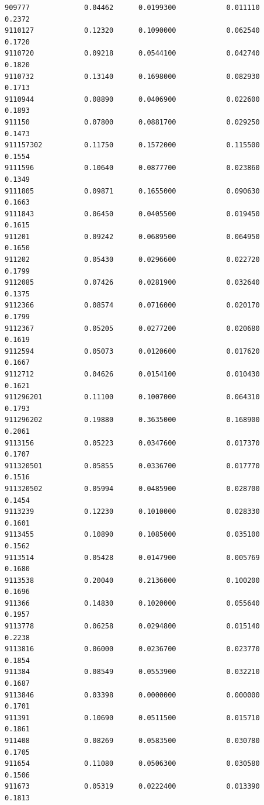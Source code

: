 \documentclass[
  letterpaper,
  DIV=11,
  numbers=noendperiod]{scrartcl}
\begin{document}
\begin{verbatim}
909777             0.04462      0.0199300            0.011110        0.2372
9110127            0.12320      0.1090000            0.062540        0.1720
9110720            0.09218      0.0544100            0.042740        0.1820
9110732            0.13140      0.1698000            0.082930        0.1713
9110944            0.08890      0.0406900            0.022600        0.1893
911150             0.07800      0.0881700            0.029250        0.1473
911157302          0.11750      0.1572000            0.115500        0.1554
9111596            0.10640      0.0877700            0.023860        0.1349
9111805            0.09871      0.1655000            0.090630        0.1663
9111843            0.06450      0.0405500            0.019450        0.1615
911201             0.09242      0.0689500            0.064950        0.1650
911202             0.05430      0.0296600            0.022720        0.1799
9112085            0.07426      0.0281900            0.032640        0.1375
9112366            0.08574      0.0716000            0.020170        0.1799
9112367            0.05205      0.0277200            0.020680        0.1619
9112594            0.05073      0.0120600            0.017620        0.1667
9112712            0.04626      0.0154100            0.010430        0.1621
911296201          0.11100      0.1007000            0.064310        0.1793
911296202          0.19880      0.3635000            0.168900        0.2061
9113156            0.05223      0.0347600            0.017370        0.1707
911320501          0.05855      0.0336700            0.017770        0.1516
911320502          0.05994      0.0485900            0.028700        0.1454
9113239            0.12230      0.1010000            0.028330        0.1601
9113455            0.10890      0.1085000            0.035100        0.1562
9113514            0.05428      0.0147900            0.005769        0.1680
9113538            0.20040      0.2136000            0.100200        0.1696
911366             0.14830      0.1020000            0.055640        0.1957
9113778            0.06258      0.0294800            0.015140        0.2238
9113816            0.06000      0.0236700            0.023770        0.1854
911384             0.08549      0.0553900            0.032210        0.1687
9113846            0.03398      0.0000000            0.000000        0.1701
911391             0.10690      0.0511500            0.015710        0.1861
911408             0.08269      0.0583500            0.030780        0.1705
911654             0.11080      0.0506300            0.030580        0.1506
911673             0.05319      0.0222400            0.013390        0.1813

\end{verbatim}
\end{document}

